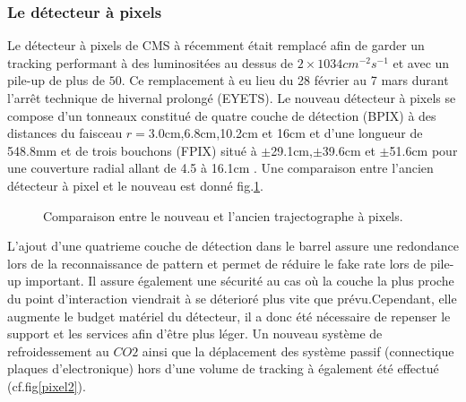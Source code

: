 \subsubsection{Le détecteur à pixels}
Le détecteur à pixels de CMS à récemment était remplacé afin de garder un tracking performant à des luminositées au dessus de $2\times10{34}cm^{-2}s^{-1}$ et avec un pile-up de plus de $50$. Ce remplacement à eu lieu du 28 février au 7 mars durant l'arrêt technique de hivernal prolongé (EYETS). Le nouveau détecteur à pixels se compose d'un tonneaux constitué de quatre couche de détection (BPIX) à des distances du faisceau $r=3.0$cm,6.8cm,10.2cm et 16cm et d'une longueur de 548.8mm et de trois bouchons (FPIX) situé à $\pm$29.1cm,$\pm$39.6cm et $\pm$51.6cm pour une couverture radial allant de 4.5 à 16.1cm . Une comparaison entre l'ancien détecteur à pixel et le nouveau est donné fig.\ref{pixel}.

	\begin{figure}[ht!]
	\hfill
	\caption{Comparaison entre le nouveau et l'ancien trajectographe à pixels.}
	\label{pixel}
\end{figure}

L'ajout d'une quatrieme couche de détection dans le barrel assure une redondance lors de la reconnaissance de pattern et permet de réduire le fake rate lors de pile-up important. Il assure également une sécurité au cas où la couche la plus proche du point d'interaction viendrait à se déterioré plus vite que prévu.Cependant, elle augmente le budget matériel du détecteur, il a donc été nécessaire de repenser le support et les services afin d'être plus léger. 
Un nouveau système de refroidessement au $CO2$ ainsi que la déplacement des système passif (connectique plaques d'electronique) hors d'une volume de tracking à également été effectué (cf.fig\ref{pixel2}).

